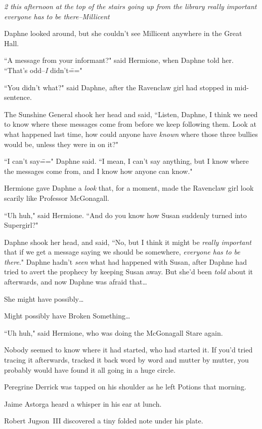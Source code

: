 \emph{2 this afternoon at the top of the stairs going up from the library \emph{really important} everyone has to be there\---Millicent}

Daphne looked around, but she couldn't see Millicent anywhere in the Great Hall.

``A message from your informant?" said Hermione, when Daphne told her. ``That's odd\---\emph{I} didn't\==="

``You didn't what?" said Daphne, after the Ravenclaw girl had stopped in mid-sentence.

The Sunshine General shook her head and said, ``Listen, Daphne, I think we need to know where these messages come from before we keep following them. Look at what happened last time, how could anyone have \emph{known} where those three bullies would be, unless they were in on it?"

``I can't say\===" Daphne said. ``I mean, I can't say anything, but I know where the messages come from, and I know how anyone can know."

Hermione gave Daphne a \emph{look} that, for a moment, made the Ravenclaw girl look scarily like Professor McGonagall.

``Uh huh," said Hermione. ``And do you know how Susan suddenly turned into Supergirl?"

Daphne shook her head, and said, ``No, but I think it might be \emph{really important} that if we get a message saying we should be somewhere, \emph{everyone has to be there}." Daphne hadn't \emph{seen} what had happened with Susan, after Daphne had tried to avert the prophecy by keeping Susan away. But she'd been \emph{told} about it afterwards, and now Daphne was afraid that{\ldots}

She might have possibly{\ldots}

Might possibly have Broken Something{\ldots}

``Uh huh," said Hermione, who was doing the McGonagall Stare again.

\later

Nobody seemed to know where it had started, who had started it. If you'd tried tracing it afterwards, tracked it back word by word and mutter by mutter, you probably would have found it all going in a huge circle.

Peregrine Derrick was tapped on his shoulder as he left Potions that morning.

Jaime Astorga heard a whisper in his ear at lunch.

Robert Jugson~III discovered a tiny folded note under his plate.

